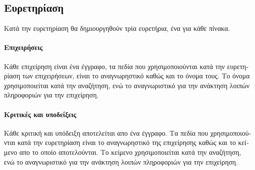 \newpage
\subsection{\textgreek{Ευρετηρίαση}}

\textgreek{
    Κατά την ευρετηρίαση θα δημιουργηθούν τρία ευρετήρια, ένα για κάθε πίνακα.
}

\paragraph{\textgreek{Επιχειρήσεις}} {
    \textgreek{
        Κάθε επιχείρηση είναι ένα έγγραφο, τα πεδία που χρησιμοποιούνται
        κατά την ευρετηρίαση των επιχειρήσεων, είναι το αναγνωρηστικό καθώς
        και το όνομα τους. Το όνομα χρησιμοποιείται κατά την αναζήτηση, ενώ
        το αναγνωριστικό για την ανάκτηση λοιπών πληροφοριών για την επιχείρηση.
    }
}

\paragraph{\textgreek{Κριτικές και υποδείξεις}} {
    \textgreek{
        Κάθε κριτική και υπόδειξη αποτελείται απο ένα έγγραφο. Τα πεδία
        που χρησιμοποιούνται κατά την ευρετηρίαση είναι το αναγνωρηστικό 
        της επιχείρησης καθώς και το κείμενο απο το οποίο αποτελούνται.
        Το κείμενο χρησιμοποιείται κατά την αναζήτηση, ενώ το
        αναγνωριστικό για την ανάκτηση λοιπών πληροφοριών για την επιχείρηση.
    }
}
